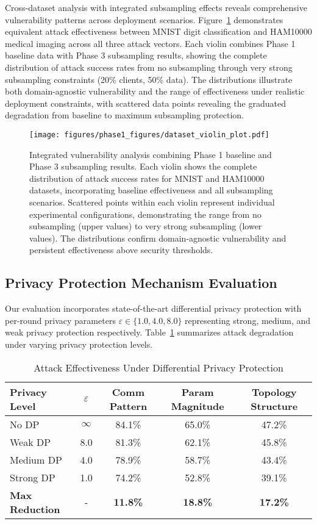 Cross-dataset analysis with integrated subsampling effects reveals comprehensive vulnerability patterns across deployment scenarios. Figure~\ref{fig:dataset_violin} demonstrates equivalent attack effectiveness between MNIST digit classification and HAM10000 medical imaging across all three attack vectors. Each violin combines Phase 1 baseline data with Phase 3 subsampling results, showing the complete distribution of attack success rates from no subsampling through very strong subsampling constraints (20\% clients, 50\% data). The distributions illustrate both domain-agnostic vulnerability and the range of effectiveness under realistic deployment constraints, with scattered data points revealing the graduated degradation from baseline to maximum subsampling protection.

\begin{figure}[!t]
\centering
\texttt{[image: figures/phase1\_figures/dataset\_violin\_plot.pdf]}
\caption{Integrated vulnerability analysis combining Phase 1 baseline and Phase 3 subsampling results. Each violin shows the complete distribution of attack success rates for MNIST and HAM10000 datasets, incorporating baseline effectiveness and all subsampling scenarios. Scattered points within each violin represent individual experimental configurations, demonstrating the range from no subsampling (upper values) to very strong subsampling (lower values). The distributions confirm domain-agnostic vulnerability and persistent effectiveness above security thresholds.}
\label{fig:dataset_violin}
\end{figure}

\subsection{Privacy Protection Mechanism Evaluation}

Our evaluation incorporates state-of-the-art differential privacy protection with per-round privacy parameters $\varepsilon \in \{1.0, 4.0, 8.0\}$ representing strong, medium, and weak privacy protection respectively. Table~\ref{tab:dp_effectiveness} summarizes attack degradation under varying privacy protection levels.

\begin{table}[!t]
\caption{Attack Effectiveness Under Differential Privacy Protection}
\label{tab:dp_effectiveness}
\centering
\footnotesize
\begin{tabular}{@{}lcccc@{}}
\toprule
\textbf{Privacy Level} & \textbf{$\varepsilon$} & \textbf{Comm Pattern} & \textbf{Param Magnitude} & \textbf{Topology Structure} \\
\midrule
No DP & $\infty$ & 84.1\% & 65.0\% & 47.2\% \\
Weak DP & 8.0 & 81.3\% & 62.1\% & 45.8\% \\
Medium DP & 4.0 & 78.9\% & 58.7\% & 43.4\% \\
Strong DP & 1.0 & 74.2\% & 52.8\% & 39.1\% \\
\midrule
\textbf{Max Reduction} & - & \textbf{11.8\%} & \textbf{18.8\%} & \textbf{17.2\%} \\
\bottomrule
\end{tabular}
\end{table}

